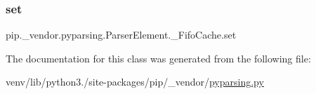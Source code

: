 \subsubsection{\texorpdfstring{set}{set}}
{\footnotesize\ttfamily pip.\+\_\+vendor.\+pyparsing.\+Parser\+Element.\+\_\+\+Fifo\+Cache.\+set}



The documentation for this class was generated from the following file\+:\begin{DoxyCompactItemize}
\item 
venv/lib/python3./site-\/packages/pip/\+\_\+vendor/\hyperlink{pip_2__vendor_2pyparsing_8py}{pyparsing.\+py}\end{DoxyCompactItemize}
